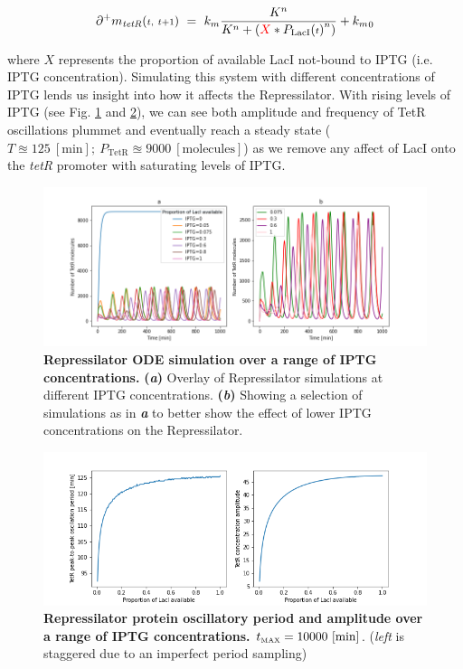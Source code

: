 \documentclass[runningheads,a4paper]{llncs}
\begin{document}
\begin{equation*}
    \partial^{+}m_{\textrm{\textit{tetR}}}({\scriptstyle t,\ t+1})\ =\ k_{m}\frac{K^{n}}{K^{n}+(\textcolor{red}{X}*{P_{\textrm{LacI}}({\scriptstyle t})}^{n})}+{k_{m}}_{0}
\end{equation*}

\noindent where $X$ represents the proportion of available LacI not-bound to IPTG (i.e. IPTG concentration). Simulating this system with different concentrations of IPTG lends us insight into how it affects the Repressilator. With rising levels of IPTG (see Fig. \ref{fig:fig13} and \ref{fig:fig14}), we can see both amplitude and frequency of TetR oscillations plummet and eventually reach a steady state ($T \approxeq 125\ [\textrm{min}];\ P_{\textrm{TetR}} \approxeq 9000\ [\textrm{molecules}]$) as we remove any affect of LacI onto the \textit{tetR} promoter with saturating levels of IPTG.

\begin{figure}
    \singlespacing
    \centering
    \includegraphics[width=1\textwidth,trim={1.5cm 0 1.5cm 0},clip]{suplementary_information_and_code/Task5_figure1.png}
    \caption{\textbf{Repressilator ODE simulation over a range of IPTG concentrations.} \textbf{(\textit{a})} Overlay of Repressilator simulations at different IPTG concentrations. \textbf{(\textit{b})} Showing a selection of simulations as in \textbf{\textit{a}} to better show the effect of lower IPTG concentrations on the Repressilator.}
    \label{fig:fig13}
\end{figure}

\begin{figure}[ht]
    \singlespacing
    \centering
    \includegraphics[width=1\textwidth,trim={1.5cm 0 1.5cm 0},clip]{suplementary_information_and_code/Task5_figure2.png}
    \caption{\textbf{Repressilator protein oscillatory period and amplitude over a range of IPTG concentrations.} $t_{\textrm{\tiny MAX}} = 10 000\ [\textrm{min}]$. (\textit{left} is staggered due to an imperfect period sampling)}
    \label{fig:fig14}
\end{figure}
\end{document}
